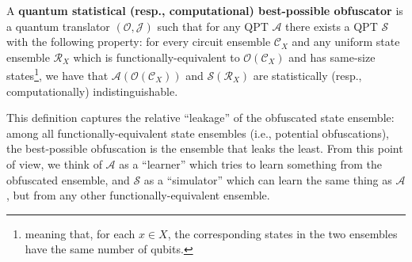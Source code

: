 \documentclass[envcountsame]{llncs}
\numberwithin{equation}{section}
\newcommand{\algo}{\mathcal}
\begin{document}
\begin{definition}\label{def:best-possible}
A \textbf{quantum statistical (resp., computational) best-possible obfuscator} is a quantum translator $(\mathcal O, \mathcal J)$ such that for any QPT $\algo A$ there exists a QPT $\algo S$ with the following property: for every circuit ensemble $\mathcal C_X$ and any uniform state ensemble $\mathcal R_X$ which is functionally-equivalent to $\mathcal O(\mathcal C_X)$ and has same-size states\footnote{meaning that, for each $x \in X$, the corresponding states in the two ensembles have the same number of qubits.}, we have that $\algo A(\mathcal O(\mathcal C_X))$ and $\algo S(\mathcal R_X)$ are statistically (resp., computationally) indistinguishable.
\end{definition}

This definition captures the relative ``leakage'' of the obfuscated state ensemble: among all functionally-equivalent state ensembles (i.e., potential obfuscations), the best-possible obfuscation is the ensemble that leaks the least. From this point of view, we think of $\algo A$ as a ``learner'' which tries to learn something from the obfuscated ensemble, and $\algo S$ as a ``simulator'' which can learn the same thing as $\algo A$, but from any other functionally-equivalent ensemble.
\end{document}
